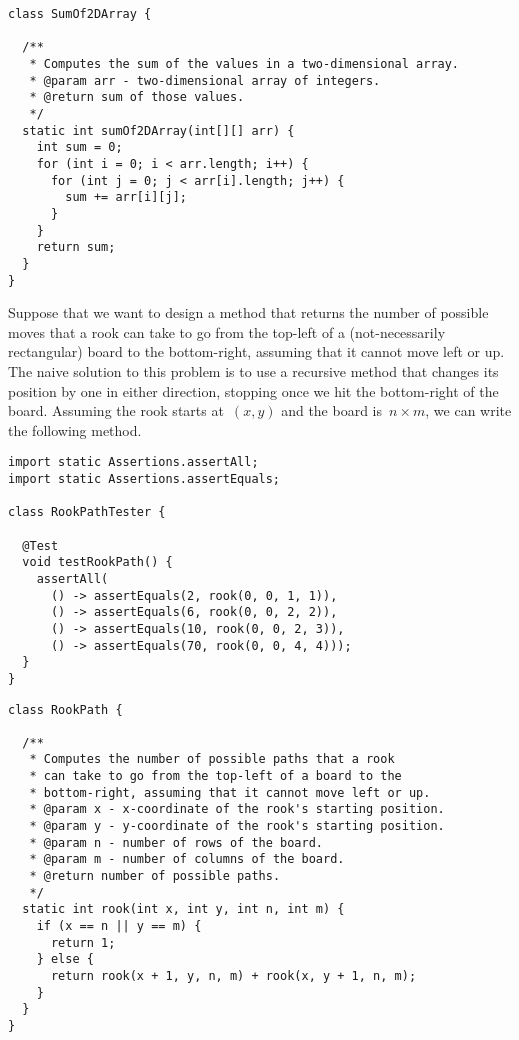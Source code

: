 \begin{lstlisting}[language=MyJava]
class SumOf2DArray {

  /**
   * Computes the sum of the values in a two-dimensional array.
   * @param arr - two-dimensional array of integers.
   * @return sum of those values.
   */
  static int sumOf2DArray(int[][] arr) {
    int sum = 0;
    for (int i = 0; i < arr.length; i++) {
      for (int j = 0; j < arr[i].length; j++) {
        sum += arr[i][j];
      }
    }
    return sum;
  }
}
\end{lstlisting}

Suppose that we want to design a method that returns the number of possible moves that a rook can take to go from the top-left of a (not-necessarily rectangular) board to the bottom-right, assuming that it cannot move left or up. 
The naive solution to this problem is to use a recursive method that changes its position by one in either direction, stopping once we hit the bottom-right of the board. 
Assuming the rook starts at~$(x, y)$ and the board is~$n \times m$, we can write the following method.

\begin{lstlisting}[language=MyJava]
import static Assertions.assertAll;
import static Assertions.assertEquals;

class RookPathTester {

  @Test
  void testRookPath() {
    assertAll(
      () -> assertEquals(2, rook(0, 0, 1, 1)),
      () -> assertEquals(6, rook(0, 0, 2, 2)),
      () -> assertEquals(10, rook(0, 0, 2, 3)),
      () -> assertEquals(70, rook(0, 0, 4, 4)));
  }
}
\end{lstlisting}

\begin{lstlisting}[language=MyJava]
class RookPath {

  /**
   * Computes the number of possible paths that a rook 
   * can take to go from the top-left of a board to the 
   * bottom-right, assuming that it cannot move left or up.
   * @param x - x-coordinate of the rook's starting position.
   * @param y - y-coordinate of the rook's starting position.
   * @param n - number of rows of the board.
   * @param m - number of columns of the board.
   * @return number of possible paths.
   */
  static int rook(int x, int y, int n, int m) {
    if (x == n || y == m) { 
      return 1; 
    } else { 
      return rook(x + 1, y, n, m) + rook(x, y + 1, n, m); 
    }
  }
}
\end{lstlisting}

